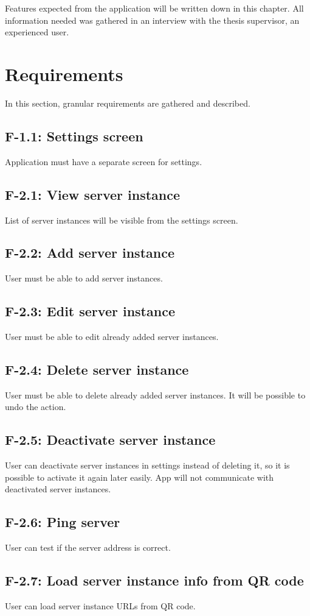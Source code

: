 Features expected from the application will be written down in this chapter.
All information needed was gathered in an interview with the thesis supervisor, an experienced \etl{} user.
\section{Requirements}
In this section, granular requirements are gathered and described.

\subsection*{F-1.1: Settings screen}
Application must have a separate screen for settings.
\subsection*{F-2.1: View server instance}
List of server instances will be visible from the settings screen.
\subsection*{F-2.2: Add server instance}
User must be able to add server instances.
\subsection*{F-2.3: Edit server instance}
User must be able to edit already added server instances.
\subsection*{F-2.4: Delete server instance}
User must be able to delete already added server instances. It will be possible to undo the action.
\subsection*{F-2.5: Deactivate server instance}
User can deactivate server instances in settings instead of deleting it, so it is possible to activate it again later easily. App will not communicate with deactivated server instances.
\subsection*{F-2.6: Ping server}
\label{subsec:ping}
User can test if the server address is correct.
\subsection*{F-2.7: Load server instance info from QR code}
\label{subsec:qrcode}
User can load server instance URLs from QR code.
